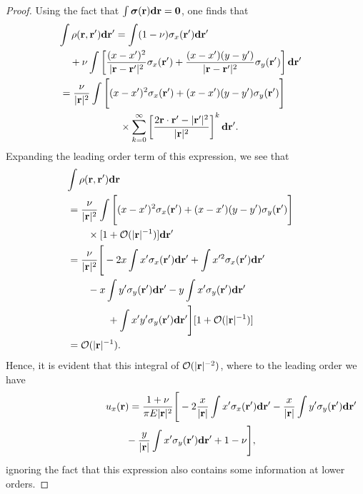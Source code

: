 \documentclass[aps,prl,reprint,twocolumn,groupedaddress,showpacs]{revtex4-1}
\newcommand{\bsigma}{{\boldsymbol\sigma}}
\def\d{{\bf d}}
\def\r{{\bf r}}
\begin{document}
\begin{proof}
Using the fact that $\int \bsigma(\r)\d\r = \mathbf{0}$, one finds that
%
\begin{align}
\lefteqn{\int \rho(\r,\r')\d\r'  =  \int (1-\nu)\sigma_x(\r')\d\r'}\nonumber\\
&\quad+\nu\int\left[ \frac{(x - x')^2}{|\r-\r'|^2} \sigma_{x}(\r') +  \frac{(x-x')(y-y')}{|\r-\r'|^2} \sigma_y(\r')  \right]\d\r' \nonumber\\
&= \frac{\nu}{|\r|^2}\int\Bigg[  (x - x')^2\sigma_{x}(\r')  + (x-x')(y-y')\sigma_y(\r')  \Bigg] \nonumber\\
&\qquad\qquad\qquad\times\sum_{k=0}^\infty \left[  \frac{2\r\cdot\r' - |\r'|^2}{|\r|^2} \right]^k \d\r'.
\end{align}
Expanding the leading order term of this expression, we see that
\begin{align*}
\lefteqn{\int\rho(\r,\r')\d\r } \nonumber\\
&= \frac{\nu}{|\r|^2}\int\Bigg[  (x - x')^2\sigma_{x}(\r')  + (x-x')(y-y')\sigma_y(\r')  \Bigg] \nonumber\\
&\qquad\times[1+\mathcal{O}(|\r|^{-1}) ]\d\r' \nonumber\\
&= \frac{\nu}{|\r|^2}  \Bigg[  -2x\int x'\sigma_x(\r')\d\r'  + \int x'^2\sigma_x(\r')\d\r'  \nonumber\\
&\qquad  - x\int y' \sigma_y(\r') \d\r'- y\int x'\sigma_y(\r')\d\r' \nonumber\\
&\qquad\qquad + \int x'y' \sigma_y(\r') \d\r'\Bigg][1+\mathcal{O}(|\r|^{-1}) ]\nonumber\\
&=\mathcal{O}(|\r|^{-1}).
\end{align*}
Hence, it is evident that this integral of $\mathcal{O}(|\r|^{-2})$, where to the leading order we have
\begin{align}
\lefteqn{u_x(\r) = \frac{1+\nu}{\pi E |\r|^2}\Bigg[ -2\frac{x}{|\r|}\int x'\sigma_x(\r')\d\r' - \frac{x}{|\r|}\int y' \sigma_y(\r') \d\r'  }\nonumber\\
&\qquad- \frac{y}{|\r|}\int x'\sigma_y(\r')\d\r' + 1-\nu \Bigg],
\end{align}
ignoring the fact that this expression also contains some information at lower orders.


\end{proof}
\end{document}
